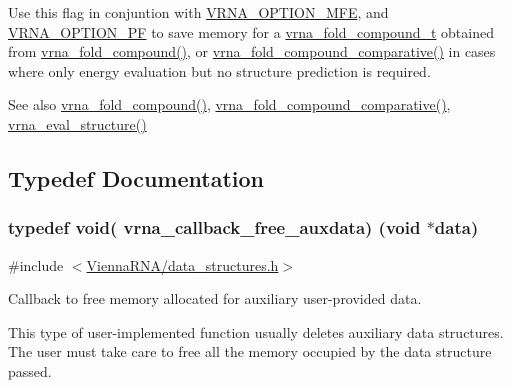 Use this flag in conjuntion with \hyperlink{group__fold__compound_gae63be9127fe7dcc1f9bb14f5bb1064ee}{V\+R\+N\+A\+\_\+\+O\+P\+T\+I\+O\+N\+\_\+\+M\+FE}, and \hyperlink{group__fold__compound_gabfbadcddda3e74ce7f49035ef8f058f7}{V\+R\+N\+A\+\_\+\+O\+P\+T\+I\+O\+N\+\_\+\+PF} to save memory for a \hyperlink{group__fold__compound_ga1b0cef17fd40466cef5968eaeeff6166}{vrna\+\_\+fold\+\_\+compound\+\_\+t} obtained from \hyperlink{group__fold__compound_ga6601d994ba32b11511b36f68b08403be}{vrna\+\_\+fold\+\_\+compound()}, or \hyperlink{group__fold__compound_gad6bacc816af274922b13d947f708aa0c}{vrna\+\_\+fold\+\_\+compound\+\_\+comparative()} in cases where only energy evaluation but no structure prediction is required.

\begin{DoxySeeAlso}{See also}
\hyperlink{group__fold__compound_ga6601d994ba32b11511b36f68b08403be}{vrna\+\_\+fold\+\_\+compound()}, \hyperlink{group__fold__compound_gad6bacc816af274922b13d947f708aa0c}{vrna\+\_\+fold\+\_\+compound\+\_\+comparative()}, \hyperlink{group__eval_ga58f199f1438d794a265f3b27fc8ea631}{vrna\+\_\+eval\+\_\+structure()} 
\end{DoxySeeAlso}


\subsection{Typedef Documentation}
\subsubsection[{\texorpdfstring{vrna\+\_\+callback\+\_\+free\+\_\+auxdata}{vrna_callback_free_auxdata}}]{\setlength{\rightskip}{0pt plus 5cm}typedef void( vrna\+\_\+callback\+\_\+free\+\_\+auxdata) (void $\ast$data)}\hypertarget{group__fold__compound_ga3ae51bfd5fc3236652d1de4e3274b49b}{}\label{group__fold__compound_ga3ae51bfd5fc3236652d1de4e3274b49b}


{\ttfamily \#include $<$\hyperlink{data__structures_8h}{Vienna\+R\+N\+A/data\+\_\+structures.\+h}$>$}



Callback to free memory allocated for auxiliary user-\/provided data. 

This type of user-\/implemented function usually deletes auxiliary data structures. The user must take care to free all the memory occupied by the data structure passed.


